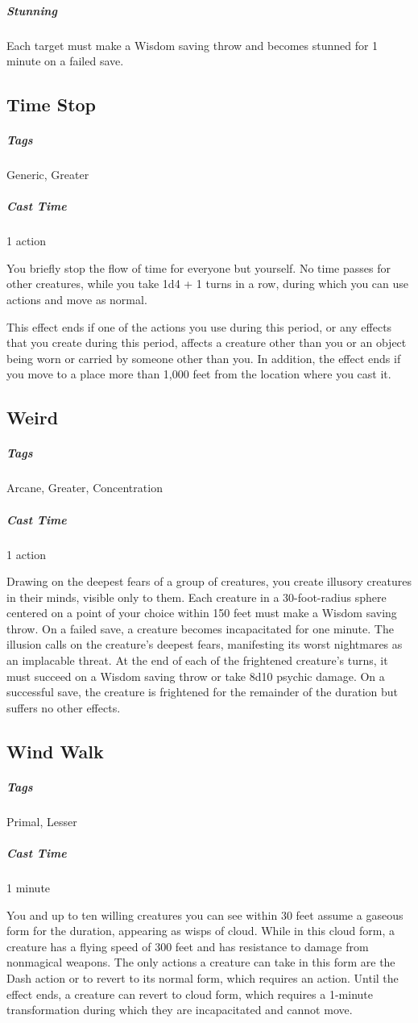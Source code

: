\subparagraph{Stunning} Each target must make a Wisdom saving throw and becomes stunned for 1 minute on a failed save.

\subsection{Time Stop}
\subparagraph*{Tags} Generic, Greater
\subparagraph*{Cast Time} 1 action

You briefly stop the flow of time for everyone but yourself. No time passes for other creatures, while you take 1d4 + 1 turns in a row, during which you can use actions and move as normal.

This effect ends if one of the actions you use during this period, or any effects that you create during this period, affects a creature other than you or an object being worn or carried by someone other than you. In addition, the effect ends if you move to a place more than 1,000 feet from the location where you cast it.

\subsection{Weird}
\subparagraph*{Tags} Arcane, Greater, Concentration
\subparagraph*{Cast Time} 1 action

Drawing on the deepest fears of a group of creatures, you create illusory creatures in their minds, visible only to them. Each creature in a 30-foot-radius sphere centered on a point of your choice within 150 feet must make a Wisdom saving throw. On a failed save, a creature becomes incapacitated for one minute. The illusion calls on the creature’s deepest fears, manifesting its worst nightmares as an implacable threat. At the end of each of the frightened creature’s turns, it must succeed on a Wisdom saving throw or take 8d10 psychic damage. On a successful save, the creature is frightened for the remainder of the duration but suffers no other effects.

\subsection{Wind Walk}
\subparagraph*{Tags} Primal, Lesser
\subparagraph*{Cast Time} 1 minute

You and up to ten willing creatures you can see within 30 feet assume a gaseous form for the duration, appearing as wisps of cloud. While in this cloud form, a creature has a flying speed of 300 feet and has resistance to damage from nonmagical weapons. The only actions a creature can take in this form are the Dash action or to revert to its normal form, which requires an action. Until the effect ends, a creature can revert to cloud form, which requires a 1-minute transformation during which they are incapacitated and cannot move.

